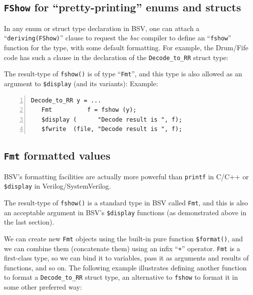 
\subsection{{\tt FShow} for ``pretty-printing'' enums and structs}


In any enum or struct type declaration in BSV, one can attach a
``\verb|deriving(FShow)|'' clause to request the \emph{bsc} compiler
to define an ``\verb|fshow|'' function for the type, with some default
formatting.  For example, the Drum/Fife code has such a clause in the
declaration of the \verb|Decode_to_RR| struct type:



The result-type of \verb|fshow()| is of type ``\verb|Fmt|'', and this
type is also allowed as an argument to \verb|$display| (and its
variants):  Example:

{\small
\begin{Verbatim}[frame=single, numbers=left]
   Decode_to_RR y = ...
   Fmt          f = fshow (y);
   $display (      "Decode result is ", f);
   $fwrite  (file, "Decode result is ", f);
\end{Verbatim}
}


\subsection{{\tt Fmt} formatted values}


BSV's formatting facilities are actually more powerful than
\verb|printf| in C/C++ or \verb|$display| in Verilog/SystemVerilog.

The result-type of \verb|fshow()| is a standard type in BSV called
\verb|Fmt|, and this is also an acceptable argument in BSV's
\verb|$display| functions (as demonstrated above in the last section).

We can create new \verb|Fmt| objects using the built-in pure function
\verb|$format()|, and we can combine them (concatenate them) using an
infix ``\verb|+|'' operator.  \verb|Fmt| is a first-class type, so we
can bind it to variables, pass it as arguments and results of
functions, and so on.  The following example illustrates defining
another function to format a \verb|Decode_to_RR| struct type, an
alternative to \verb|fshow| to format it in some other preferred way:

